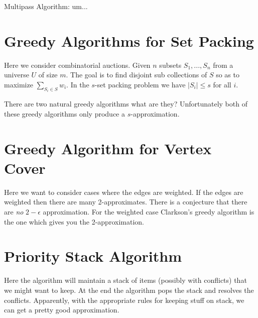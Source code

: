 \documentclass[twoside]{article}
\begin{document}
Multipass Algorithm: um...

\section{Greedy Algorithms for Set Packing}
Here we consider combinatorial auctions. Given $n$ subsets $S_1, ..., S_n$ from a universe $U$ of size $m$. The goal is to find disjoint sub collections of $S$ so as to maximize $\sum_{S_i \in S} w_i$. In the $s$-set packing problem we have $|S_i| \leq s$ for all $i$. 

There are two natural greedy algorithms what are they? Unfortunately both of these greedy algorithms only produce a $s$-approximation.

\section{Greedy Algorithm for Vertex Cover}
Here we want to consider cases where the edges are weighted. If the edges are weighted then there are many 2-approximates. There is a conjecture that there are \emph{no} $2-\epsilon$ approximation. For the weighted case Clarkson's greedy algorithm is the one which gives you the 2-approximation.

\section{Priority Stack Algorithm}
Here the algorithm will maintain a stack of items (possibly with conflicts) that we might want to keep. At the end the algorithm pops the stack and resolves the conflicts. Apparently, with the appropriate rules for keeping stuff on stack, we can get a pretty good approximation.
\end{document}
